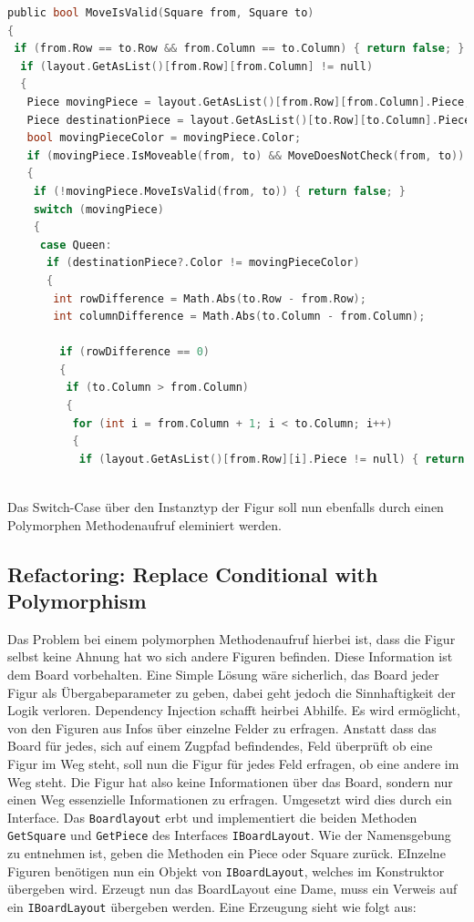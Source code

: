 \documentclass[
10pt, %
a4paper, %
oneside, %
headinclude,footinclude, %
BCOR5mm, %
]{scrartcl}
\begin{document}
	\begin{lstlisting}[language=c, style=mStyle]
public bool MoveIsValid(Square from, Square to)
{
 if (from.Row == to.Row && from.Column == to.Column) { return false; }
  if (layout.GetAsList()[from.Row][from.Column] != null)
  {
   Piece movingPiece = layout.GetAsList()[from.Row][from.Column].Piece;
   Piece destinationPiece = layout.GetAsList()[to.Row][to.Column].Piece;
   bool movingPieceColor = movingPiece.Color;
   if (movingPiece.IsMoveable(from, to) && MoveDoesNotCheck(from, to))
   {
	if (!movingPiece.MoveIsValid(from, to)) { return false; }
	switch (movingPiece)
	{
	 case Queen:
	  if (destinationPiece?.Color != movingPieceColor)
	  {
	   int rowDifference = Math.Abs(to.Row - from.Row);
	   int columnDifference = Math.Abs(to.Column - from.Column);

	    if (rowDifference == 0)
		{
		 if (to.Column > from.Column)
		 {
		  for (int i = from.Column + 1; i < to.Column; i++)
		  {
		   if (layout.GetAsList()[from.Row][i].Piece != null) { return false; }
		  
	\end{lstlisting}

	Das Switch-Case über den Instanztyp der Figur soll nun ebenfalls durch einen Polymorphen Methodenaufruf eleminiert werden. 

	\subsection{Refactoring: Replace Conditional with Polymorphism}
	Das Problem bei einem polymorphen Methodenaufruf hierbei ist, dass die Figur selbst keine Ahnung hat wo sich andere Figuren befinden. Diese Information ist dem Board vorbehalten. Eine Simple Lösung wäre sicherlich, das Board jeder Figur als Übergabeparameter zu geben, dabei geht jedoch die Sinnhaftigkeit der Logik verloren. Dependency Injection schafft heirbei Abhilfe. Es wird ermöglicht, von den Figuren aus Infos über einzelne Felder zu erfragen. Anstatt dass das Board für jedes, sich auf einem Zugpfad befindendes, Feld überprüft ob eine Figur im Weg steht, soll nun die Figur für jedes Feld erfragen, ob eine andere im Weg steht. Die Figur hat also keine Informationen über das Board, sondern nur einen Weg essenzielle Informationen zu erfragen. Umgesetzt wird dies durch ein Interface. Das \texttt{Boardlayout} erbt und implementiert die beiden Methoden \texttt{GetSquare} und \texttt{GetPiece} des Interfaces \texttt{IBoardLayout}. Wie der Namensgebung zu entnehmen ist, geben die Methoden ein Piece oder Square zurück. EInzelne Figuren benötigen nun ein Objekt von \texttt{IBoardLayout}, welches im Konstruktor übergeben wird. Erzeugt nun das BoardLayout eine Dame, muss ein Verweis auf ein \texttt{IBoardLayout} übergeben werden. Eine Erzeugung sieht wie folgt aus:
\end{document}
